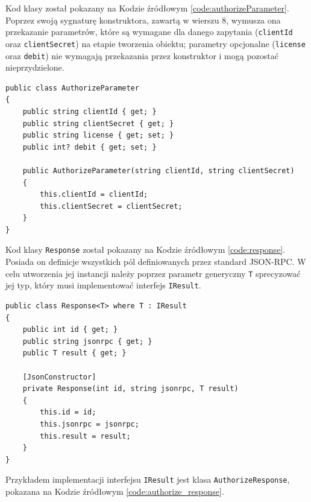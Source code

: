 \documentclass[skorowidz,skroty]{dyplomWEZUT}
\begin{document}
\vfill

Kod klasy  został pokazany na Kodzie źródłowym \vref{code:authorizeParameter}. Poprzez swoją sygnaturę konstruktora, zawartą w wierszu 8, wymusza ona przekazanie parametrów, które są wymagane dla danego zapytania (\lstinline[language={[Sharp]C}]{clientId} oraz \lstinline[language={[Sharp]C}]{clientSecret}) na etapie tworzenia obiektu; parametry opcjonalne (\lstinline[language={[Sharp]C}]{license} oraz \lstinline[language={[Sharp]C}]{debit}) nie wymagają przekazania przez konstruktor i mogą pozostać nieprzydzielone.

\pagebreak

\begin{lstlisting}[language={[Sharp]C}]
public class AuthorizeParameter
{
    public string clientId { get; }
    public string clientSecret { get; }
    public string license { get; set; }
    public int? debit { get; set; }

    public AuthorizeParameter(string clientId, string clientSecret)
    {
        this.clientId = clientId;
        this.clientSecret = clientSecret;
    }
}
\end{lstlisting}

\vfill

Kod klasy \lstinline[language={[Sharp]C}]{Response} został pokazany na Kodzie źródłowym \vref{code:response}. Posiada on definicje wszystkich pól definiowanych przez standard JSON-RPC. W celu utworzenia jej instancji należy poprzez parametr generyczny \lstinline[language={[Sharp]C}]{T} sprecyzować jej typ, który musi implementować interfejs \lstinline[language={[Sharp]C}]{IResult}.

\vfill

\begin{lstlisting}[language={[Sharp]C}]
public class Response<T> where T : IResult
{
    public int id { get; }
    public string jsonrpc { get; }
    public T result { get; }

    [JsonConstructor]
    private Response(int id, string jsonrpc, T result)
    {
        this.id = id;
        this.jsonrpc = jsonrpc;
        this.result = result;
    }
}
\end{lstlisting}

\vfill

Przykładem implementacji interfejsu \lstinline[language={[Sharp]C}]{IResult} jest klasa \lstinline[language={[Sharp]C}]{AuthorizeResponse}, pokazana na Kodzie źródłowym \vref{code:authorize_response}.
\end{document}

